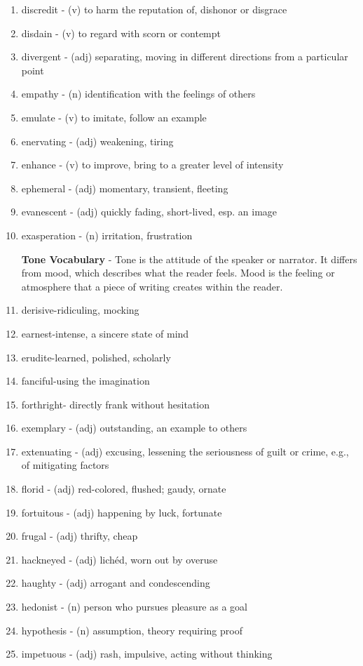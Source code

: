 \begin{enumerate}
\item discredit - (v) to harm the reputation of, dishonor or disgrace
\item disdain - (v) to regard with scorn or contempt
\item divergent - (adj) separating, moving in different directions from a particular point
\item empathy - (n) identification with the feelings of others
\item emulate - (v) to imitate, follow an example
\item enervating - (adj) weakening, tiring
\item enhance - (v) to improve, bring to a greater level of intensity
\item ephemeral - (adj) momentary, transient, fleeting
\item evanescent - (adj) quickly fading, short-lived, esp. an image
\item exasperation - (n) irritation, frustration

\bigskip
\textbf{Tone Vocabulary} - Tone is the attitude of the speaker or narrator.  It differs from mood, which describes what the reader feels.  Mood is the feeling or atmosphere that a piece of writing creates within the reader.  


\item derisive-ridiculing, mocking
\item earnest-intense, a sincere state of mind
\item erudite-learned, polished, scholarly
\item fanciful-using the imagination
\item forthright- directly frank without hesitation 

\bigskip
\item exemplary - (adj) outstanding, an example to others
\item extenuating - (adj) excusing, lessening the seriousness of guilt or crime, e.g., of mitigating factors
\item florid - (adj) red-colored, flushed; gaudy, ornate
\item fortuitous - (adj) happening by luck, fortunate
\item frugal - (adj) thrifty, cheap
\item hackneyed - (adj)  lichéd, worn out by overuse
\item haughty - (adj) arrogant and condescending
\item hedonist - (n) person who pursues pleasure as a goal
\item hypothesis - (n) assumption, theory requiring proof
\item impetuous - (adj) rash, impulsive, acting without thinking


\end{enumerate}
